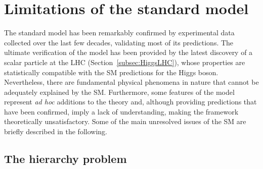 \section{Limitations of the standard model}
\label{sec:SMLimitations}

The standard model has been remarkably confirmed by experimental data collected over the last few decades, validating most of its predictions.
The ultimate verification of the model has been provided by the latest discovery of a scalar particle at the LHC (Section~\ref{subsec:HiggsLHC}), whose properties are statistically compatible with the SM predictions for the Higgs boson.
Nevertheless, there are fundamental physical phenomena in nature that cannot be adequately explained by the SM. %
Furthermore, some features of the model represent \textit{ad hoc} additions to the theory and, although providing predictions that have been confirmed, imply a lack of understanding, making the framework theoretically unsatisfactory.
Some of the main unresolved issues of the SM are briefly described in the following.

\subsection*{The hierarchy problem}

